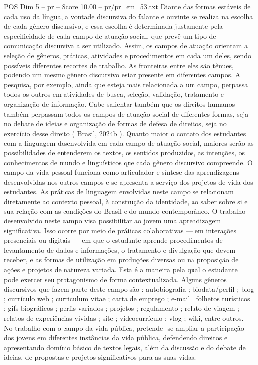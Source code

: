 \begin{textsample}{POS Dim 5 – pr – Score 10.00 – pr/pr\_em\_53.txt}
Diante das formas estáveis de cada uso da língua, a vontade discursiva do falante e ouvinte se realiza na escolha de cada gênero discursivo, e essa escolha é determinada justamente pela especificidade de cada campo de atuação social, que prevê um tipo de comunicação discursiva a ser utilizado.
Assim, os campos de atuação orientam a seleção de gêneros, práticas, atividades e procedimentos em cada um deles, sendo possíveis diferentes recortes de trabalho.
As fronteiras entre eles são tênues, podendo um mesmo gênero discursivo estar presente em diferentes campos.
A pesquisa, por exemplo, ainda que esteja mais relacionada a um campo, perpassa todos os outros em atividades de busca, seleção, validação, tratamento e organização de informação.
Cabe salientar também que os direitos humanos também perpassam todos os campos de atuação social de diferentes formas, seja no debate de ideias e organização de formas de defesa de direitos, seja no exercício desse direito ( Brasil, 2024b ).
Quanto maior o contato dos estudantes com a linguagem desenvolvida em cada campo de atuação social, maiores serão as possibilidades de entenderem os textos, os sentidos produzidos, as intenções, os conhecimentos de mundo e linguísticos que cada gênero discursivo compreende.
O campo da vida pessoal funciona como articulador e síntese das aprendizagens desenvolvidas nos outros campos e se apresenta a serviço dos projetos de vida dos estudantes.
As práticas de linguagem envolvidas neste campo se relacionam diretamente ao contexto pessoal, à construção da identidade, ao saber sobre si e sua relação com as condições do Brasil e do mundo contemporâneo.
O trabalho desenvolvido neste campo visa possibilitar ao jovem uma aprendizagem significativa.
Isso ocorre por meio de práticas colaborativas — em interações presenciais ou digitais — em que o estudante aprende procedimentos de levantamento de dados e informações, o tratamento e divulgação que devem receber, e as formas de utilização em produções diversas ou na proposição de ações e projetos de natureza variada.
Esta é a maneira pela qual o estudante pode exercer seu protagonismo de forma contextualizada.
Alguns gêneros discursivos que fazem parte deste campo são : autobiografia ; biodata/perfil ; blog ; currículo web ; curriculum vitae ; carta de emprego ; e-mail ; folhetos turísticos ; gifs biográficos ; perfis variados ; projetos ; regulamento ; relato de viagem ; relatos de experiências vividas ; site ; videocurrículo ; vlog ; wiki, entre outros.
No trabalho com o campo da vida pública, pretende -se ampliar a participação dos jovens em diferentes instâncias da vida pública, defendendo direitos e apresentando domínio básico de textos legais, além da discussão e do debate de ideias, de propostas e projetos significativos para as suas vidas.

\end{textsample}
